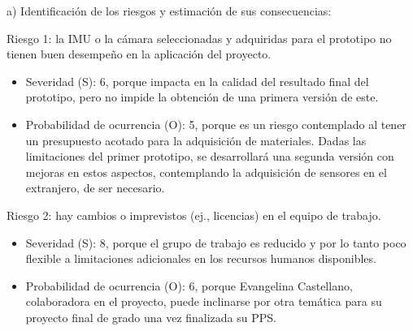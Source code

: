 \documentclass[
11pt, %
codirector, %
]{charter}
\begin{document}


 

 


a) Identificación de los riesgos y estimación de sus consecuencias:

Riesgo 1: la IMU o la cámara seleccionadas y adquiridas para el prototipo no tienen buen desempeño en la aplicación del proyecto.
\begin{itemize}
	\item Severidad (S): 6, porque impacta en la calidad del resultado final del prototipo, pero no impide la obtención de una primera versión de este. 
	\item Probabilidad de ocurrencia (O): 5, porque es un riesgo contemplado al tener un presupuesto acotado para la adquisición de materiales. Dadas las limitaciones del primer prototipo, se desarrollará una segunda versión con mejoras en estos aspectos, contemplando la adquisición de sensores en el extranjero, de ser necesario.
\end{itemize}

Riesgo 2: hay cambios o imprevistos (ej., licencias) en el equipo de trabajo.
\begin{itemize}
	\item Severidad (S): 8, porque el grupo de trabajo es reducido y por lo tanto poco flexible a limitaciones adicionales en los recursos humanos disponibles.
	\item Probabilidad de ocurrencia (O): 6, porque Evangelina Castellano, colaboradora en el proyecto, puede inclinarse por otra temática para su proyecto final de grado una vez finalizada su PPS.
\end{itemize}
\end{document}
